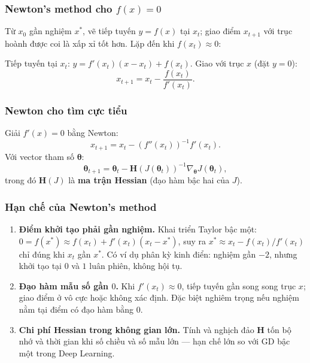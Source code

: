 \subsubsection{Newton's method cho $f(x) = 0$}

\begin{ynghia}[title={Ý tưởng hình học}]
Từ $x_0$ gần nghiệm $x^*$, vẽ tiếp tuyến $y = f(x)$ tại $x_t$; giao điểm $x_{t+1}$ với trục hoành được coi là xấp xỉ tốt hơn. Lặp đến khi $f(x_t) \approx 0$:

\end{ynghia}

\begin{congthuc}[title={Công thức Newton một biến}]
Tiếp tuyến tại $x_t$: $y = f'(x_t)(x - x_t) + f(x_t)$. Giao với trục $x$ (đặt $y = 0$):
\[
 x_{t+1} = x_t - \frac{f(x_t)}{f'(x_t)}.
\]
\end{congthuc}

\subsubsection{Newton cho tìm cực tiểu}

\begin{congthuc}[title={Áp dụng cho $f'(x) = 0$ và không gian nhiều chiều}]
Giải $f'(x) = 0$ bằng Newton:
\[
 x_{t+1} = x_t -(f''(x_t))^{-1}{f'(x_t)}.
\]
Với vector tham số $\boldsymbol{\theta}$:
\[
 \boldsymbol{\theta}_{t+1} = \boldsymbol{\theta}_t - \mathbf{H}(J(\boldsymbol{\theta}_t))^{-1} \nabla_{\boldsymbol{\theta}} J(\boldsymbol{\theta}_t),
\]
trong đó $\mathbf{H}(J)$ là \textbf{ma trận Hessian} (đạo hàm bậc hai của $J$).
\end{congthuc}

\subsubsection{Hạn chế của Newton's method}

\begin{luuy}[title={Ba hạn chế chính}]
\begin{enumerate}
 \item \textbf{Điểm khởi tạo phải gần nghiệm.} Khai triển Taylor bậc một: $0 = f(x^*) \approx f(x_t) + f'(x_t)(x_t - x^*)$, suy ra $x^* \approx x_t - f(x_t)/f'(x_t)$ chỉ đúng khi $x_t$ gần $x^*$. Có ví dụ phân kỳ kinh điển: nghiệm gần $-2$, nhưng khởi tạo tại $0$ và $1$ luân phiên, không hội tụ.

 \item \textbf{Đạo hàm mẫu số gần $0$.} Khi $f'(x_t) \approx 0$, tiếp tuyến gần song song trục $x$; giao điểm ở vô cực hoặc không xác định. Đặc biệt nghiêm trọng nếu nghiệm nằm tại điểm có đạo hàm bằng $0$.

 \item \textbf{Chi phí Hessian trong không gian lớn.} Tính và nghịch đảo $\mathbf{H}$ tốn bộ nhớ và thời gian khi số chiều và số mẫu lớn --- hạn chế lớn so với GD bậc một trong Deep Learning.
\end{enumerate}
\end{luuy}

